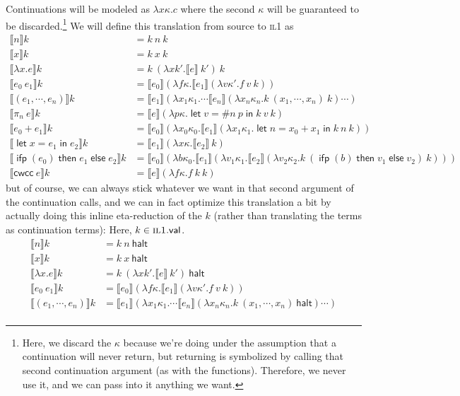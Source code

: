 \documentclass[11pt,a4paper]{article}
\newcommand {\coo} [1] {\ensuremath{\operatorname{\mathsf{#1}}}}
\newcommand {\co} [1] {\coo{#1}}
\newcommand {\Ifp}[3] {\co{ifp} (#1) \co{then} #2 \co{else} #3}
\newcommand{\Let}[1]{\coo{let} #1 \coo{in} }
\newcommand{\f}[1]{\textsc{#1}}
\newcommand{\g}[1]{\textsf{#1}}
\newcommand{\trans}[2]{\ensuremath{\mathcal{#1}\llbracket #2\rrbracket}}
\begin{document}
\begin{enumerate}[label=\textbf{Excercise \arabic*\ }]
\begin{enumerate}
Continuations will be modeled as $\lambda x\kappa.c$ where the second $\kappa$ will be guaranteed to be discarded.\footnote{Here, we discard the $\kappa$ because we're doing under the assumption that a continuation will never return, but returning is symbolized by calling that second continuation argument (as with the functions). Therefore, we never use it, and we can pass into it anything we want.} We will define this translation from source to \f{il1} as
\begin{align*}
\trans{}{n}k &= k~n~k \\
\trans{}{x}k &= k~x~k \\
\trans{}{\lambda x.e}k &= k~(\lambda xk'. \trans{}{e}~k')~k \\
\trans{}{e_0~e_1}k &= \trans{}{e_0}(\lambda f\kappa. \trans{}{e_1}(\lambda v\kappa'. f~v~k)) \\
\trans{}{(e_1,\cdots,e_n)} k &= \trans{}{e_1}(\lambda x_1\kappa_1. \cdots \trans{}{e_n}(\lambda x_n\kappa_n. k~(x_1,\cdots,x_n)~k)\cdots) \\
\trans{}{\pi_n~e} k &= \trans{}{e} (\lambda p\kappa. \Let{v = \#n~p}{k~v~k}) \\
\trans{}{e_0 + e_1} k &= \trans{}{e_0} (\lambda x_0\kappa_0. \trans{}{e_1} (\lambda x_1\kappa_1. \Let{n = x_0 + x_1}{k~n~k})) \\
\trans{}{\Let{x = e_1}{e_2}} k &= \trans{}{e_1}(\lambda x\kappa. \trans{}{e_2}~k) \\
\trans{}{\Ifp{e_0}{e_1}{e_2}} k &= \trans{}{e_0}(\lambda b\kappa_0. \trans{}{e_1} (\lambda v_1\kappa_1. \trans{}{e_2} (\lambda v_2\kappa_2. k~(\Ifp{b}{v_1}{v_2})~k))) \\
\trans{}{\g{cwcc}~e} k &= \trans{}{e}(\lambda f\kappa. f~k~k)
\end{align*}
but of course, we can always stick whatever we want in that second argument of the continuation calls, and we can in fact optimize this translation a bit by actually doing this inline eta-reduction of the $k$ (rather than translating the terms as continuation terms): Here, $k \in \f{il1}.\g{val}$.
\begin{align*}
\trans{}{n}k &= k~n~\g{halt} \\
\trans{}{x}k &= k~x~\g{halt} \\
\trans{}{\lambda x.e}k &= k~(\lambda xk'. \trans{}{e}~k')~\g{halt} \\
\trans{}{e_0~e_1}k &= \trans{}{e_0}(\lambda f\kappa. \trans{}{e_1}(\lambda v\kappa'. f~v~k)) \\
\trans{}{(e_1,\cdots,e_n)} k &= \trans{}{e_1}(\lambda x_1\kappa_1. \cdots \trans{}{e_n}(\lambda x_n\kappa_n. k~(x_1,\cdots,x_n)~\g{halt})\cdots) \\

\end{align*}
\end{enumerate}
\end{enumerate}
\end{document}
